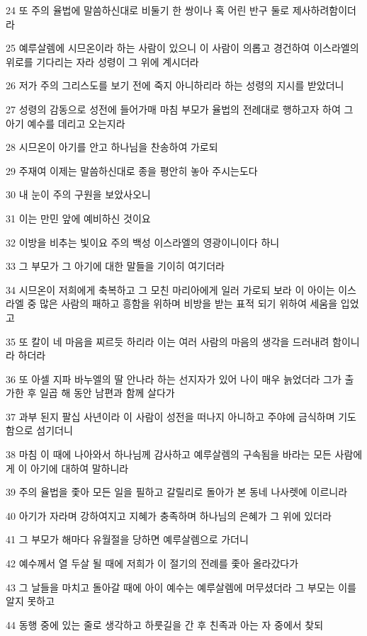 \par 24 또 주의 율법에 말씀하신대로 비둘기 한 쌍이나 혹 어린 반구 둘로 제사하려함이더라
\par 25 예루살렘에 시므온이라 하는 사람이 있으니 이 사람이 의롭고 경건하여 이스라엘의 위로를 기다리는 자라 성령이 그 위에 계시더라
\par 26 저가 주의 그리스도를 보기 전에 죽지 아니하리라 하는 성령의 지시를 받았더니
\par 27 성령의 감동으로 성전에 들어가매 마침 부모가 율법의 전례대로 행하고자 하여 그 아기 예수를 데리고 오는지라
\par 28 시므온이 아기를 안고 하나님을 찬송하여 가로되
\par 29 주재여 이제는 말씀하신대로 종을 평안히 놓아 주시는도다
\par 30 내 눈이 주의 구원을 보았사오니
\par 31 이는 만민 앞에 예비하신 것이요
\par 32 이방을 비추는 빛이요 주의 백성 이스라엘의 영광이니이다 하니
\par 33 그 부모가 그 아기에 대한 말들을 기이히 여기더라
\par 34 시므온이 저희에게 축복하고 그 모친 마리아에게 일러 가로되 보라 이 아이는 이스라엘 중 많은 사람의 패하고 흥함을 위하며 비방을 받는 표적 되기 위하여 세움을 입었고
\par 35 또 칼이 네 마음을 찌르듯 하리라 이는 여러 사람의 마음의 생각을 드러내려 함이니라 하더라
\par 36 또 아셀 지파 바누엘의 딸 안나라 하는 선지자가 있어 나이 매우 늙었더라 그가 출가한 후 일곱 해 동안 남편과 함께 살다가
\par 37 과부 된지 팔십 사년이라 이 사람이 성전을 떠나지 아니하고 주야에 금식하며 기도함으로 섬기더니
\par 38 마침 이 때에 나아와서 하나님께 감사하고 예루살렘의 구속됨을 바라는 모든 사람에게 이 아기에 대하여 말하니라
\par 39 주의 율법을 좇아 모든 일을 필하고 갈릴리로 돌아가 본 동네 나사렛에 이르니라
\par 40 아기가 자라며 강하여지고 지혜가 충족하며 하나님의 은혜가 그 위에 있더라
\par 41 그 부모가 해마다 유월절을 당하면 예루살렘으로 가더니
\par 42 예수께서 열 두살 될 때에 저희가 이 절기의 전례를 좇아 올라갔다가
\par 43 그 날들을 마치고 돌아갈 때에 아이 예수는 예루살렘에 머무셨더라 그 부모는 이를 알지 못하고
\par 44 동행 중에 있는 줄로 생각하고 하룻길을 간 후 친족과 아는 자 중에서 찾되
